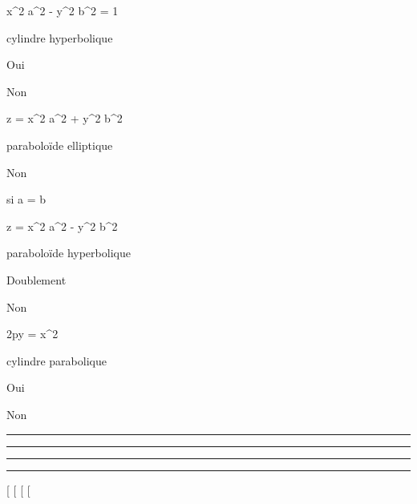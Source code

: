 \documentclass[]{article}
\begin{document}
 x^2 \over a^2 -
y^2 \over b^2 = 1

cylindre hyperbolique

Oui

Non

z = x^2 \over a^2 +
y^2 \over b^2

paraboloïde elliptique

Non

si a = b

z = x^2 \over a^2 -
y^2 \over b^2

paraboloïde hyperbolique

Doublement

Non

2py = x^2

cylindre parabolique

Oui

Non

\begin{center}\rule{3in}{0.4pt}\end{center}

\begin{center}\rule{3in}{0.4pt}\end{center}

\begin{center}\rule{3in}{0.4pt}\end{center}

\begin{center}\rule{3in}{0.4pt}\end{center}

{[}
{[}
{[}
{[}
\end{document}
